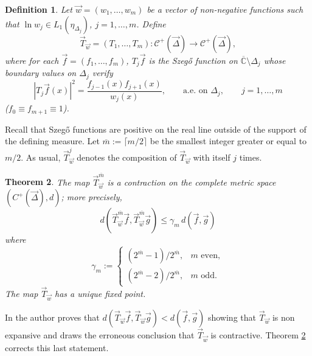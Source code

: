 \documentclass{amsart}
\numberwithin{equation}{section}
\newtheorem{theorem}{Theorem}[section]
\newtheorem{definition}[theorem]{Definition}
\theoremstyle{definition}
\newcommand{\CC}{\mathbb{C}}      %
\begin{document}
    \begin{definition}
        \label{df:op:Tw}
        Let $\vec{w} = (w_1,\ldots,w_m)$ be a vector of non-negative functions such that $\ln w_j \in L_1(\eta_{\Delta_j})$, $j=1,\ldots,m$. Define
    \[  \vec{T}_{\vec{w}} = (T_1,\ldots,T_m): \mathcal{C}^+({\vec{\Delta}}) \longrightarrow \mathcal{C}^+({\vec{\Delta}}),
    \]
    where for each $\vec{f} = (f_1,\ldots,f_m)$, $T_j \vec{f}$ is the Szeg\H{o} function on $\overline{\CC} \setminus \Delta_j$ whose boundary values on $\Delta_j$ verify
    \begin{equation}
        \label{boundary}
        |T_j\vec{f}(x)|^2 = \frac{f_{j-1}(x) f_{j+1}(x)}{w_j(x)}, \qquad \mbox{a.e. on}\,\, \Delta_j, \qquad j=1,\ldots,m
    \end{equation}
    ($f_0  \equiv f_{m+1} \equiv 1$).
    \end{definition}

    Recall that Szeg\H{o} functions are positive on the real line outside of the support of the defining measure. Let ${\overline{m}} := \lceil m/2 \rceil$ be the smallest integer greater or equal to $m/2$. As usual,  $\vec{T}_{\vec{w}}^j$  denotes the composition of $\vec{T}_{\vec{w}}$ with itself $j$ times.

    \begin{theorem}
        \label{puntofijo}
        The map $\vec{T}_{\vec{w}}^{\overline{m}}$ is a contraction on the complete metric space $( {C}^+({\vec{\Delta}}),d)$; more precisely,
        \begin{equation}
            \label{contraction}
            d(\vec{T}_{\vec{w}}^{\overline{m}}\vec{f},\vec{T}_{\vec{w}}^{\overline{m}}\vec{g}) \leq  \gamma_m\, d( \vec{f}, \vec{g})
        \end{equation}
        where
        \[ \gamma_m :=
        \left\{
        \begin{array}{cc}
        (2^{\overline{m}} -1)/2^{\overline{m}}, & m \,\,\mathrm{even}, \\
        (2^{\overline{m}} -2)/2^{\overline{m}}, & m \,\,\mathrm{odd}.
        \end{array}
        \right.
        \]
        The map $\vec{T}_{\vec{w}}$ has a unique fixed point.
    \end{theorem}

In \cite[Proposition 1.1]{sasha99} the author proves that
$d(\vec{T}_{\vec{w}} \vec{f},\vec{T}_{\vec{w}} \vec{g}) <
 d( \vec{f}, \vec{g})$ showing that $\vec{T}_{\vec{w}}$ is non expansive and draws the erroneous conclusion that
 $\vec{T}_{\vec{w}}$ is contractive. Theorem \ref{puntofijo} corrects this last statement.
\end{document}
